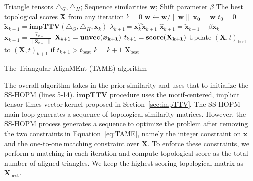 \documentclass[10pt, journal, compsoc, final]{IEEEtran}
\newcommand{\bs}[1]{\boldsymbol{#1}}
\newcommand{\Vector}[1]{\bs{#1}}
\newcommand{\Matrix}[1]{\mathbf{#1}}
\newcommand{\Tensor}[1]{\mathbf{\mathcal{#1}}}
\begin{document}
\begin{algorithm}
\centering
\begin{algorithmic}[1]
\REQUIRE Triangle tensors $\Tensor{\bigtriangleup}_G, \Tensor{\bigtriangleup}_H$;   Sequence similarities $\Vector{w}$; Shift parameter $\beta$
\ENSURE The best topological scores $\Matrix{X}$ from any iteration
\STATE $k = 0$ 
\STATE $\Vector{w} \leftarrow \Vector{w}/\|\Vector{w} \|$
\STATE $\Vector{x_0} = \Vector{w}$
\STATE $t_0 = 0$
\REPEAT
\STATE $\tilde{\Vector{x}}_{k+1} = \textbf{impTTV}(\Tensor{\bigtriangleup}_G, \Tensor{\bigtriangleup}_H, \Vector{x}_k)$ 
\STATE $\lambda_{k+1} = \Vector{x}_{k}^{T} \tilde{\Vector{x}}_{k+1}^{} $
\STATE $\hat{\Vector{x}}_{k+1} = \tilde{\Vector{x}}_{k+1} + \beta \Vector{x}_{k} $ 
\STATE $\Vector{x}_{k+1} = \frac{\hat{\Vector{x}}_{k+1}}{\| \hat{\Vector{x}}_{k+1} \|}$
\STATE $\Matrix{X}_{k+1} = \bf{unvec}(\Vector{x}_{k+1})$
\STATE $ t_{k+1} =  \bf{score}(\Matrix{X}_{k+1})$
\STATE Update $(\Matrix{X}, t)_{\text{best}}$ to $(\Matrix{X}, t)_{k+1}$ if $t_{k+1} > t_{\text{best}}$
\STATE $k = k+1$
\RETURN $\Matrix{X}_{\text{best}}$

\end{algorithmic}
\caption{The Triangular AlignMEnt (TAME) algorithm}
\label{alg:TAME}
\end{algorithm}

The overall algorithm takes in the prior similarity and uses that to initialize the SS-HOPM (lines 5-14). $\textbf{impTTV}$ procedure uses the motif-centered, implicit tensor-times-vector kernel proposed in Section~\ref{sec:impTTV}. The SS-HOPM main loop generates a sequence of topological similarity 
matrices. However, the SS-HOPM process generates a sequence to optimize the problem after removing
the two constraints in Equation~\ref{eq:TAME}, namely the integer constraint on $\Vector{x}$ and the one-to-one matching 
constraint over $\Matrix{X}$. 
To enforce these constraints, we perform a matching in each iteration and compute topological score as the total number of aligned triangles. We keep the highest scoring topological matrix as $\Matrix{X}_{\text{best}}$.
\end{document}
